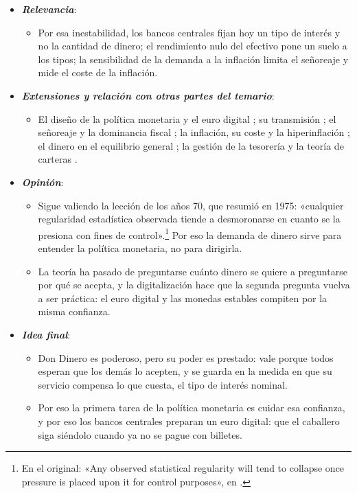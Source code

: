 \documentclass[11pt]{article}
\begin{document}
\begin{itemize}
\begin{itemize}
  \item Los datos confirman los signos y unas elasticidades moderadas, pero no la estabilidad.
  \end{itemize}
\item \textbf{\emph{Relevancia}}:
  \begin{itemize}
  \item Por esa inestabilidad, los bancos centrales fijan hoy un tipo de interés y no la cantidad de dinero; el rendimiento nulo del efectivo pone un suelo a los tipos; la sensibilidad de la demanda a la inflación limita el señoreaje y mide el coste de la inflación.
  \end{itemize}
\item \textbf{\emph{Extensiones y relación con otras partes del temario}}:
  \begin{itemize}
  \item El diseño de la política monetaria y el euro digital ; su transmisión ; el señoreaje y la dominancia fiscal ; la inflación, su coste y la hiperinflación ; el dinero en el equilibrio general ; la gestión de la tesorería  y la teoría de carteras .
  \end{itemize}
\item \textbf{\emph{Opinión}}:
  \begin{itemize}
  \item Sigue valiendo la lección de los años 70, que  resumió en 1975: «cualquier regularidad estadística observada tiende a desmoronarse en cuanto se la presiona con fines de control».\footnote{En el original: «Any observed statistical regularity will tend to collapse once pressure is placed upon it for control purposes», en \textcite{Goodhart1975Problems}.} Por eso la demanda de dinero sirve para entender la política monetaria, no para dirigirla.
  \item La teoría ha pasado de preguntarse cuánto dinero se quiere a preguntarse por qué se acepta, y la digitalización hace que la segunda pregunta vuelva a ser práctica: el euro digital y las monedas estables compiten por la misma confianza.
  \end{itemize}
\item \textbf{\emph{Idea final}}:
  \begin{itemize}
  \item Don Dinero es poderoso, pero su poder es prestado: vale porque todos esperan que los demás lo acepten, y se guarda en la medida en que su servicio compensa lo que cuesta, el tipo de interés nominal.

  \item Por eso la primera tarea de la política monetaria es cuidar esa confianza, y por eso los bancos centrales preparan un euro digital: que el caballero siga siéndolo cuando ya no se pague con billetes.
  \end{itemize}
\end{itemize}
\end{document}
